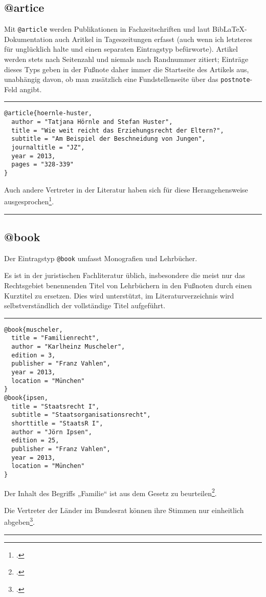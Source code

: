 \documentclass[11pt,a4paper,DIV=calc]{scrartcl}
\newcommand\software[1]{\textsf{#1}}
\newcommand\Biblatex{\software{Bib\LaTeX{}}\xspace}
\newenvironment{rubexample}{\par\vspace{\baselineskip}\hrule\par\begin{refsection}}{\end{refsection}\par\hrule\par\vspace{\baselineskip}}
\begin{document}
\subsection{@artice}

Mit \verb+@article+ werden Publikationen in Fachzeitschriften und laut
\Biblatex-Do\-ku\-men\-ta\-tion auch Aritkel in Tageszeitungen erfasst (auch
wenn ich letzteres für unglücklich halte und einen separaten
Eintragstyp befürworte). Artikel werden stets nach Seitenzahl und
niemals nach Randnummer zitiert; Einträge dieses Typs geben in der
Fußnote daher immer die Startseite des Artikels aus, unabhängig davon,
ob man zusätzlich eine Fundstellenseite über das \verb+postnote+-Feld
angibt.

\begin{rubexample}
\begin{verbatim}
@article{hoernle-huster,
  author = "Tatjana Hörnle and Stefan Huster",
  title = "Wie weit reicht das Erziehungsrecht der Eltern?",
  subtitle = "Am Beispiel der Beschneidung von Jungen",
  journaltitle = "JZ",
  year = 2013,
  pages = "328-339"
}
\end{verbatim}

Auch andere Vertreter in der Literatur haben sich für diese
Herangehensweise ausgesprochen\footcite[330]{hoernle-huster}.

\printbibliography
\end{rubexample}

\subsection{@book}

Der Eintragstyp \verb+@book+ umfasst Monografien und Lehrbücher.

Es ist in der juristischen Fachliteratur üblich, insbesondere die
meist nur das Rechtsgebiet benennenden Titel von Lehrbüchern in den
Fußnoten durch einen Kurztitel zu ersetzen. Dies wird unterstützt, im
Literaturverzeichnis wird selbstverständlich der vollständige Titel
aufgeführt.

\begin{rubexample}

\begin{verbatim}
@book{muscheler,
  title = "Familienrecht",
  author = "Karlheinz Muscheler",
  edition = 3,
  publisher = "Franz Vahlen",
  year = 2013,
  location = "München"
}
@book{ipsen,
  title = "Staatsrecht I",
  subtitle = "Staatsorganisationsrecht",
  shorttitle = "StaatsR I",
  author = "Jörn Ipsen",
  edition = 25,
  publisher = "Franz Vahlen",
  year = 2013,
  location = "München"
}
\end{verbatim}

Der Inhalt des Begriffs „Familie“ ist aus dem Gesetz zu
beurteilen\footcite[\S\,1 Rnr. 3]{muscheler}.

Die Vertreter der Länder im Bundesrat können ihre Stimmen nur
einheitlich abgeben\footcite[\S\,7 Rnr. 343ff]{ipsen}.

\printbibliography
\end{rubexample}
\end{document}
